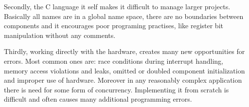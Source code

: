 Secondly, the C language it self makes it difficult to manage larger
projects. Basically all names are in a global name space, there are no
boundaries between components and it encourages poor programing
practises, like register bit manipulation without any comments.

Thirdly, working directly with the hardware, creates many new
opportunities for errors. Most common ones are: race conditions during
interrupt handling, memory access violations and leaks, omitted or
doubled component initialization and improper use of hardware.
Moreover in any reasonably complex application there is need for some
form of concurrency.  Implementing it from scratch is difficult and
often causes many additional programming errors.



